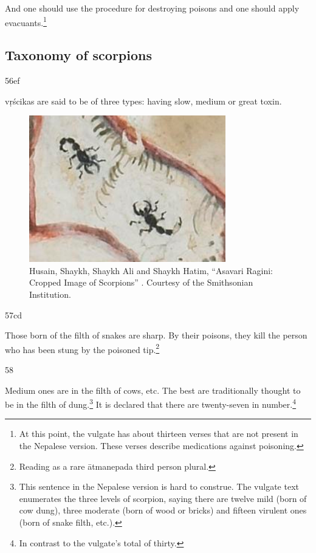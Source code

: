 \begin{translation}
And one should use the procedure for destroying poisons and one should apply 
evacuants.\footnote{At this point, the vulgate has about thirteen verses that 
are not present in the Nepalese version.  These verses describe medications against 
poisoning.}


 
\subsection{Taxonomy of scorpions}

\item[56ef]

\Glspl{vṛścika} are said to be of three types: having slow, medium or great toxin.
 
 \begin{figure}
     \centering
     \includegraphics[width=0.7\linewidth]{"media/Scorpions Smithsonian"}
     \caption{Husain, Shaykh, Shaykh Ali and Shaykh Hatim, “Asavari Ragini: 
     Cropped Image of Scorpions” \citep{husa-1591}. Courtesy of the Smithsonian 
     Institution.}
     \label{fig:scorpions-smithsonian}
 \end{figure}
 
 \item[57cd]
 
 Those born of the filth of snakes are sharp.  By their poisons, they kill the person 
 who has been stung by the poisoned tip.\footnote{Reading  as a rare 
 ātmanepada third person plural.}
 
 \item[58]
 
 
 Medium ones are in the filth of cows, etc. The best are traditionally 
 thought to be in the filth of dung.\footnote{This sentence in the Nepalese version 
 is hard to construe.  The vulgate text enumerates the three levels of scorpion, 
 saying there are twelve mild (born of cow dung), three moderate (born of wood or 
 bricks) and fifteen virulent ones (born of snake filth, etc.).}
     It is declared that there are twenty-seven in number.\footnote{In contrast to the 
     vulgate's total of thirty.} 
         

\end{translation}
